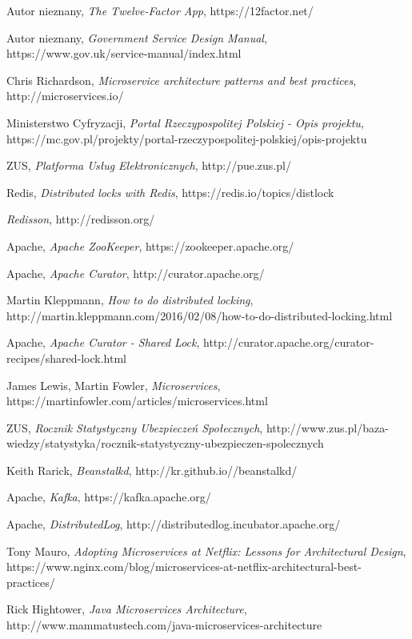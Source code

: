 \documentclass[licencjacka]{pracamgr}
\begin{document}
\begin{thebibliography}{99}

 Autor nieznany, \textit{The Twelve-Factor App}, https://12factor.net/

 Autor nieznany, \textit{Government Service Design Manual},
https://www.gov.uk/service-manual/index.html

 Chris Richardson, \textit{Microservice architecture patterns and best practices},
http://microservices.io/

 Ministerstwo Cyfryzacji, \textit{Portal Rzeczypospolitej Polskiej - Opis projektu},
https://mc.gov.pl/projekty/portal-rzeczypospolitej-polskiej/opis-projektu

 ZUS, \textit{Platforma Usług Elektronicznych},
http://pue.zus.pl/

 Redis, \textit{Distributed locks with Redis},
https://redis.io/topics/distlock

 \textit{Redisson},
http://redisson.org/

 Apache, \textit{Apache ZooKeeper},
https://zookeeper.apache.org/

 Apache, \textit{Apache Curator},
http://curator.apache.org/

 Martin Kleppmann, \textit{How to do distributed locking},
http://martin.kleppmann.com/2016/02/08/how-to-do-distributed-locking.html

 Apache, \textit{Apache Curator - Shared Lock},
http://curator.apache.org/curator-recipes/shared-lock.html

 James Lewis, Martin Fowler, \textit{Microservices},
https://martinfowler.com/articles/microservices.html

 ZUS, \textit{Rocznik Statystyczny Ubezpieczeń Społecznych},
http://www.zus.pl/baza-wiedzy/statystyka/rocznik-statystyczny-ubezpieczen-spolecznych

 Keith Rarick, \textit{Beanstalkd},
http://kr.github.io//beanstalkd/

 Apache, \textit{Kafka},
https://kafka.apache.org/

 Apache, \textit{DistributedLog},
http://distributedlog.incubator.apache.org/

 Tony Mauro, \textit{Adopting Microservices at Netflix: Lessons for Architectural Design},
https://www.nginx.com/blog/microservices-at-netflix-architectural-best-practices/

 Rick Hightower, \textit{Java Microservices Architecture},
http://www.mammatustech.com/java-microservices-architecture

\end{thebibliography}
\end{document}
